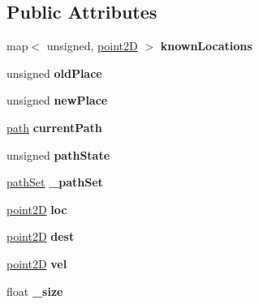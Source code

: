\subsection*{Public Attributes}
\begin{DoxyCompactItemize}
\item 
\mbox{\label{classagent_a3b5f19fe489aeaa4a44365b80a20de50}} 
map$<$ unsigned, \mbox{\hyperlink{classpoint2D}{point2D}} $>$ {\bfseries known\+Locations}
\item 
\mbox{\label{classagent_adb1d1bc0cee97d9c4d3c68536e84f3f6}} 
unsigned {\bfseries old\+Place}
\item 
\mbox{\label{classagent_a14bacf305626b17d29eef5681f284f7a}} 
unsigned {\bfseries new\+Place}
\item 
\mbox{\label{classagent_ad7fc52cb970a53fb03f3a08f6e00c4de}} 
\mbox{\hyperlink{structpath}{path}} {\bfseries current\+Path}
\item 
\mbox{\label{classagent_ac297c591823cd9c23c8cdbcaea964344}} 
unsigned {\bfseries path\+State}
\item 
\mbox{\label{classagent_a51641f914b14e5c5be4fd6ea7a6f50f3}} 
\mbox{\hyperlink{structpathSet}{path\+Set}} {\bfseries \+\_\+path\+Set}
\item 
\mbox{\label{classagent_a625057d4c53fe2581f1c963d4da601ba}} 
\mbox{\hyperlink{classpoint2D}{point2D}} {\bfseries loc}
\item 
\mbox{\label{classagent_a1cf261bbb26132bbc68c0a7d920437f4}} 
\mbox{\hyperlink{classpoint2D}{point2D}} {\bfseries dest}
\item 
\mbox{\label{classagent_a5ff902fc713259415266ca26f2bb8ecb}} 
\mbox{\hyperlink{classpoint2D}{point2D}} {\bfseries vel}
\item 
\mbox{\label{classagent_aa029a96be166646fb046873a73d3fbdd}} 
float {\bfseries \+\_\+size}
\item 
\mbox{\label{classagent_a9c76eb9369864fb60a2d5a4f44c56843}} 

\end{DoxyCompactItemize}
